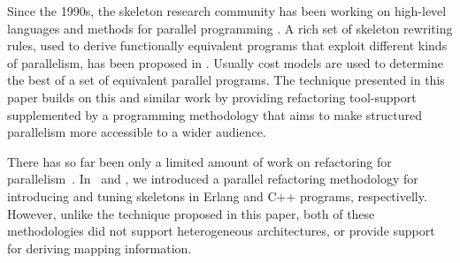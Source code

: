 \documentclass[smallextended]{svjour3}
\begin{document}
Since the 1990s, the skeleton research community has been
working on high-level languages and methods for parallel programming
\cite{cole-th}.
A rich set of skeleton rewriting rules, used to derive functionally equivalent programs that exploit different kinds of parallelism, has been proposed in \cite{aldinuc:stream-data:98,FAN:PPA:01,SkillicornC95}. Usually cost models are used to determine the best of a set of equivalent parallel programs.
The technique presented in this paper builds on this
and similar work by providing refactoring tool-support
supplemented by a programming methodology that
aims to make structured parallelism more accessible to a wider audience.

%
There has so far been only a limited amount of work on refactoring for parallelism~\cite{fmcoover}. 
In~\cite{hlpp} and \cite{pdp}, we introduced a parallel refactoring methodology
for introducing and tuning skeletons in Erlang and C++ programs, respectivelly. 
However, unlike the technique proposed in this paper, both of these methodologies did not support
heterogeneous architectures, or provide support for deriving mapping information.
\end{document}
